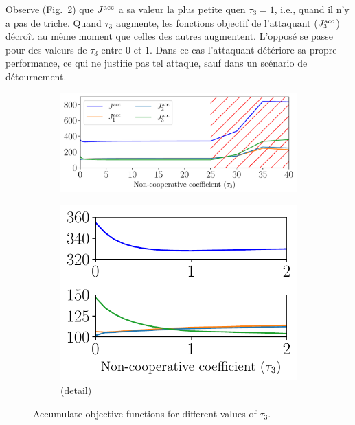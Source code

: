 \documentclass[../main.tex]{subfiles}
\begin{document}
Observe (Fig.~\ref{fig:example_vary_tau_objective_detail_fr}) que $\Jacc$ a sa valeur la plus petite quen $\tau_{3}=1$, i.e., quand il n'y a pas de triche.
Quand $\tau_{3}$ augmente, les fonctions objectif de l'attaquant ($\Jiacc[3]$) décroît au même moment que celles des autres augmentent.
L'opposé se passe pour des valeurs de $\tau_{3}$ entre $0$ et $1$.
Dans ce cas l'attaquant détériore sa propre performance, ce qui ne justifie pas tel attaque, sauf dans un scénario de détournement.

\begin{figure}[h]
  \centering
  \begin{subfigure}{0.50\textwidth}
    \includegraphics[width=\textwidth]{../img/example_primal_decomposition/example_vary_tau_J.pdf}
    \caption{}\label{fig:example_vary_tau_objective_fr}
  \end{subfigure}
  \begin{subfigure}{0.3\textwidth}
    \includegraphics[width=\textwidth]{../img/example_primal_decomposition/example_vary_tau_J_detail.pdf}
    \caption{(detail)}\label{fig:example_vary_tau_objective_detail_fr}
  \end{subfigure}
  \caption{Accumulate objective functions for different values of $\tau_{3}$.}\label{fig:example_vary_tau_objective_both_fr}
\end{figure}
\end{document}

